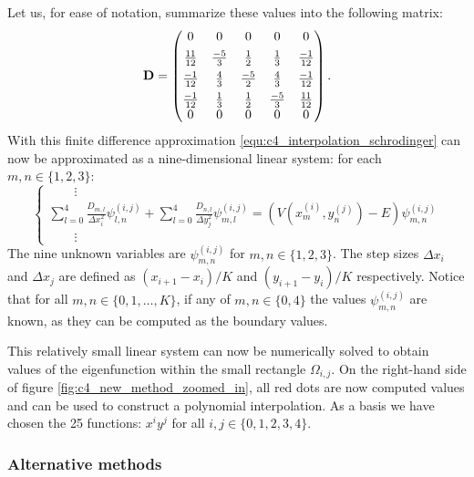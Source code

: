 Let us, for ease of notation, summarize these values into the following matrix:
$$
    \vb{D} = \begin{pmatrix}
        0                             & 0            & 0            & 0            & 0             \\
        \rule{0pt}{3ex} \frac{11}{12} & \frac{-5}{3} & \frac{1}{2}  & \frac{1}{3}  & \frac{-1}{12} \\
        \rule{0pt}{3ex} \frac{-1}{12} & \frac{4}{3}  & \frac{-5}{2} & \frac{4}{3}  & \frac{-1}{12} \\
        \rule{0pt}{3ex} \frac{-1}{12} & \frac{1}{3}  & \frac{1}{2}  & \frac{-5}{3} & \frac{11}{12} \\
        0                             & 0            & 0            & 0            & 0
    \end{pmatrix}\text{.}
$$
With this finite difference approximation \eqref{equ:c4_interpolation_schrodinger} can now be approximated as a nine-dimensional linear system: for each $m, n \in \{1,2,3\}$:
$$
    \begin{cases}
        \qquad\vdots                                                                                                                                                                                                 \\
        {\displaystyle \sum_{l=0}^4 \frac{D_{m, l}}{\Delta x_i^2}\psi^{(i,j)}_{l, n} + \sum_{l=0}^4 \frac{D_{n, l}}{\Delta y_j^2}\psi^{(i,j)}_{m, l} =  \left(V(x^{(i)}_m, y^{(j)}_n) - E\right)\psi^{(i,j)}_{m, n}} \\
        \qquad\vdots
    \end{cases}
$$
The nine unknown variables are $\psi^{(i, j)}_{m, n}$ for $m, n \in \{1,2,3\}$. The step sizes $\Delta x_i$ and $\Delta x_j$ are defined as $\left(x_{i+1} - x_{i}\right) / K$ and $\left(y_{i+1} - y_{i}\right) / K$ respectively. Notice that for all $m, n \in \{0,1,\dots, K\}$, if any of $m, n \in \{0, 4\}$ the values $\psi^{(i, j)}_{m, n}$ are known, as they can be computed as the boundary values.

This relatively small linear system can now be numerically solved to obtain values of the eigenfunction within the small rectangle $\Omega_{i,j}$. On the right-hand side of figure \ref{fig:c4_new_method_zoomed_in}, all red dots are now computed values and can be used to construct a polynomial interpolation. As a basis we have chosen the 25 functions: $x^i y^j$ for all $i,j \in \{0,1,2,3,4\}$.


\subsubsection{Alternative methods}

